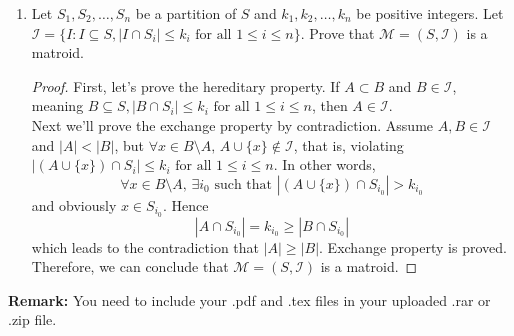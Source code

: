 \documentclass[12pt,a4paper]{article}
\theoremstyle{case}
\theoremstyle{definition}
\begin{document}
\begin{enumerate}
    \item
    Let $S_1,S_2,\dots,S_n$ be a partition of $S$ and $k_1,k_2,\dots,k_n$ be positive integers. Let $\mathcal{I}=\{I: I \subseteq S,|I \cap S_i| \leq k_i \text { for all } 1 \leq i \leq n\}$. Prove that $\mathcal{M}=(S,\mathcal{I})$ is a matroid.

    \begin{proof}
        First, let's prove the hereditary property. If $A \subset B$ and $B \in \mathcal{I}$, meaning $B \subseteq S,|B \cap S_i| \leq k_i \text { for all } 1 \leq i \leq n$, then $A \in \mathcal{I}$. \\
        Next we'll prove the exchange property by contradiction. Assume $A,B \in \mathcal{I}$ and $| A | < | B |$, but $\forall x \in B \setminus A, \, A \cup \{x\} \notin \mathcal{I}$, that is, violating $|(A \cup \{x\}) \cap S_i| \leq k_i \text { for all } 1 \leq i \leq n$. In other words, 
        \[\forall x \in B \setminus A, \, \exists i_0 \text{ such that } |(A \cup \{x\}) \cap S_{i_0}| > k_{i_0} \]
        and obviously $x \in S_{i_0}$. Hence 
        \[| A \cap S_{i_0} | = k_{i_0} \geq | B \cap S_{i_0} |\]
        which leads to the contradiction that $| A | \geq | B |$. Exchange property is proved. \\
        Therefore, we can conclude that $\mathcal{M}=(S,\mathcal{I})$ is a matroid.
    \end{proof}

\end{enumerate}

\vspace{20pt}

\textbf{Remark:} You need to include your .pdf and .tex files in your uploaded .rar or .zip file.

\end{document}
